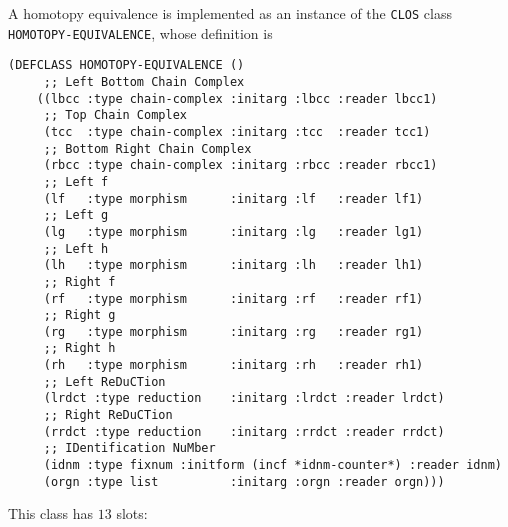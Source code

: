 A homotopy equivalence is implemented as an instance 
of the {\tt CLOS}  class {\tt HOMOTOPY-EQUIVALENCE},
whose definition is
{\footnotesize\begin{verbatim}
(DEFCLASS HOMOTOPY-EQUIVALENCE ()
     ;; Left Bottom Chain Complex
    ((lbcc :type chain-complex :initarg :lbcc :reader lbcc1)
     ;; Top Chain Complex
     (tcc  :type chain-complex :initarg :tcc  :reader tcc1)
     ;; Bottom Right Chain Complex
     (rbcc :type chain-complex :initarg :rbcc :reader rbcc1)
     ;; Left f
     (lf   :type morphism      :initarg :lf   :reader lf1)
     ;; Left g
     (lg   :type morphism      :initarg :lg   :reader lg1)
     ;; Left h
     (lh   :type morphism      :initarg :lh   :reader lh1)
     ;; Right f
     (rf   :type morphism      :initarg :rf   :reader rf1)
     ;; Right g
     (rg   :type morphism      :initarg :rg   :reader rg1)
     ;; Right h
     (rh   :type morphism      :initarg :rh   :reader rh1)
     ;; Left ReDuCTion
     (lrdct :type reduction    :initarg :lrdct :reader lrdct)
     ;; Right ReDuCTion
     (rrdct :type reduction    :initarg :rrdct :reader rrdct)
     ;; IDentification NuMber
     (idnm :type fixnum :initform (incf *idnm-counter*) :reader idnm)
     (orgn :type list          :initarg :orgn :reader orgn)))
\end{verbatim}}
This class has  $13$  slots:
